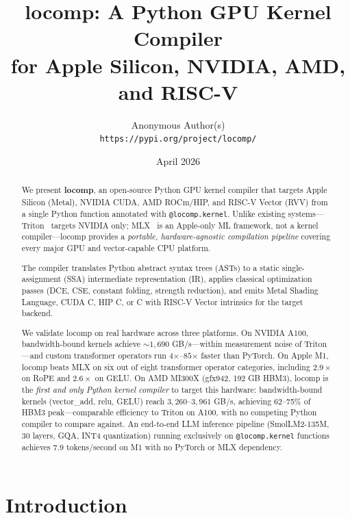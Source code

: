 \documentclass[10pt,twocolumn]{article}
\title{
  \textbf{locomp: A Python GPU Kernel Compiler\\
  for Apple Silicon, NVIDIA, AMD, and RISC-V}
}
\author{
  Anonymous Author(s)\\
  \small \texttt{https://pypi.org/project/locomp/}
}
\date{April 2026}
\begin{document}
\maketitle

\begin{abstract}
We present \textbf{locomp}, an open-source Python GPU kernel compiler that
targets Apple Silicon (Metal), NVIDIA CUDA, AMD ROCm/HIP, and RISC-V Vector
(RVV) from a single Python function annotated with \texttt{@locomp.kernel}.
Unlike existing systems---Triton~\cite{triton} targets NVIDIA only; MLX~\cite{mlx}
is an Apple-only ML framework, not a kernel compiler---locomp provides a
\emph{portable, hardware-agnostic compilation pipeline} covering every major
GPU and vector-capable CPU platform.

The compiler translates Python abstract syntax trees (ASTs) to a static
single-assignment (SSA) intermediate representation (IR), applies classical
optimization passes (DCE, CSE, constant folding, strength reduction), and
emits Metal Shading Language, CUDA C, HIP C, or C with RISC-V Vector
intrinsics for the target backend.

We validate locomp on real hardware across three platforms.
On NVIDIA A100, bandwidth-bound kernels achieve ${\sim}1{,}690$ GB/s---within
measurement noise of Triton---and custom transformer operators run
$4$$\times$--$85$$\times$ faster than PyTorch.
On Apple M1, locomp beats MLX on six out of eight transformer operator
categories, including $2.9\times$ on RoPE and $2.6\times$ on GELU.
On AMD MI300X (gfx942, 192 GB HBM3), locomp is the \emph{first and only
Python kernel compiler} to target this hardware: bandwidth-bound kernels
(vector\_add, relu, GELU) reach $3{,}260$--$3{,}961$ GB/s, achieving
62--75\% of HBM3 peak---comparable efficiency to Triton on A100, with no
competing Python compiler to compare against.
An end-to-end LLM inference pipeline (SmolLM2-135M, 30 layers, GQA, INT4
quantization) running exclusively on \texttt{@locomp.kernel} functions
achieves 7.9 tokens/second on M1 with no PyTorch or MLX dependency.
\end{abstract}

\section{Introduction}
\label{sec:intro}
\end{document}
